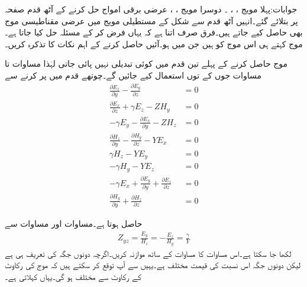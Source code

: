 جوابات:پہلا مویج ، ، ۔ دوسرا مویج ، ، 
عرضی برقی امواج حل کرنے کے آٹھ قدم صفحہ  پر بتلائے گئے۔انہیں آٹھ قدم سے شکل  کے مستطیلی مویج میں  عرضی مقناطیسی موج  بھی حاصل کیے جاتے ہیں۔فرق صرف اتنا ہے کہ یہاں  فرض کر کے مسئلہ حل کیا جاتا ہے۔ موج کہتے ہی اس موج کو ہیں جن میں  ہو۔آئیں  حاصل کرنے کے اہم نکات کا تذکرہ کریں۔

موج حاصل کرنے کے پہلے تین قدم میں کوئی تبدیلی نہیں پائی جاتی لہٰذا مساوات  تا مساوات  جوں کے توں استعمال کیے جائیں گے۔چوتھے قدم میں  پر کرنے سے
\begin{align}
\frac{\partial E_z}{\partial y}-\frac{\partial E_y}{\partial z}&=0   \label{مساوات_مویج_عرضی_مقناطیسی_ب}\\
\frac{\partial E_x}{\partial z}+\gamma E_z-Z H_y&=0  \label{مساوات_مویج_عرضی_مقناطیسی_پ} \\
-\gamma E_y-\frac{\partial E_x}{\partial y}-Z H_z&=0 \label{مساوات_مویج_عرضی_مقناطیسی_ت}\\
\frac{\partial H_z}{\partial y}-\frac{\partial H_y}{\partial z}-YE_x&=0  \label{مساوات_مویج_عرضی_مقناطیسی_ٹ}\\
\gamma H_z-YE_y&=0  \label{مساوات_مویج_عرضی_مقناطیسی_ث}\\
-\gamma H_y-YE_z&=0 \label{مساوات_مویج_عرضی_مقناطیسی_ج}\\
-\gamma E_x+\frac{\partial E_y}{\partial y}+\frac{\partial E_z}{\partial z}&=0  \label{مساوات_مویج_عرضی_مقناطیسی_چ}\\
\frac{\partial H_y}{\partial y}+\frac{\partial H_z}{\partial z}&=0  \label{مساوات_مویج_عرضی_مقناطیسی_ح}
\end{align}

حاصل ہوتا ہے۔مساوات  اور مساوات  سے
\begin{align}\label{مساوات_مویج_عرضی_مقناطیسی_رکاوٹ}
Z_{yz}=\frac{E_y}{H_z}=-\frac{E_z}{H_y}=\frac{\gamma}{Y}
\end{align}
لکھا جا سکتا ہے۔اس مساوات کا مساوات  کے ساتھ موازنہ کریں۔اگرچہ دونوں جگہ   کی تعریف   ہی ہے لیکن دونوں جگہ اس  نسبت  کی قیمت مختلف ہے۔یہیں سے آپ توقع کر سکتے ہیں کہ  موج کی رکاوٹ  کے رکاوٹ سے مختلف ہو گی۔یہاں   کہلاتی ہے۔

